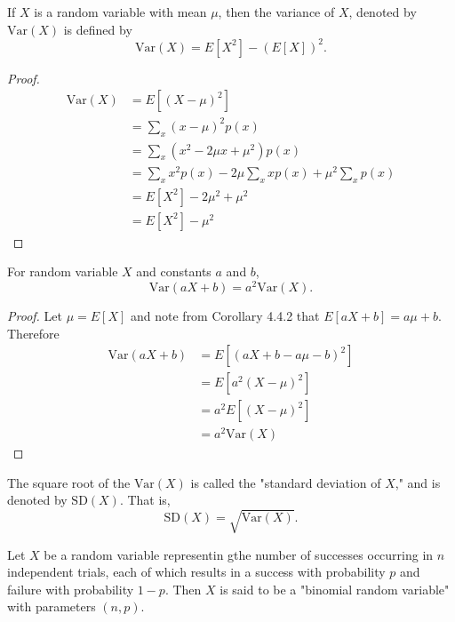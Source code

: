 \documentclass[a4paper,11pt]{article}
\begin{document}
\begin{outline}
    If \(X\) is a random variable with mean \(\mu\), then the variance of \(X\), denoted by \(\text{Var}(X)\) 
    is defined by \[\text{Var}(X) = E[X^2]-(E[X])^2\text{.} \]
    
    \pagebreak
    \begin{proof}
      \begin{align*}
        \text{Var}(X) &= E[(X-\mu)^2] \\
                      &= \sum_x(x-\mu)^2p(x) \\
                      &= \sum_x(x^2-2\mu x+\mu^2)p(x) \\
                      &= \sum_x x^2p(x) - 2\mu\sum_x xp(x) + \mu^2\sum_x p(x) \\
                      &= E[X^2] - 2\mu^2 + \mu^2 \\
                      &= E[X^2] - \mu^2
      \end{align*}
    \end{proof}
    
    For random variable \(X\) and constants \(a\) and \(b\),
    \[ \text{Var}(aX+b) = a^2\text{Var}(X)\text{.} \]
    
    \begin{proof}
      Let \(\mu = E[X]\) and note from Corollary 4.4.2 that \(E[aX+b] = a\mu+b\).
      Therefore
      \begin{align*}
        \text{Var}(aX+b) &= E[(aX+b-a\mu-b)^2] \\
                         &= E[a^2(X-\mu)^2] \\
                         &= a^2E[(X-\mu)^2] \\
                         &= a^2\text{Var}(X)
      \end{align*}
    \end{proof}
    
    The square root of the \(\text{Var}(X)\) is called the "standard deviation of \(X\)," and is denoted by 
    \(\text{SD}(X)\). That is, \[\text{SD}(X) = \sqrt{\text{Var}(X)}\text{.}\]
    
    Let \(X\) be a random variable representin gthe number of successes occurring in \(n\) independent trials, 
    each of which results in a success with probability \(p\) and failure with probability \(1-p\). Then 
    \(X\) is said to be a "binomial random variable" with parameters \((n, p)\).
    

\end{outline}
\end{document}
